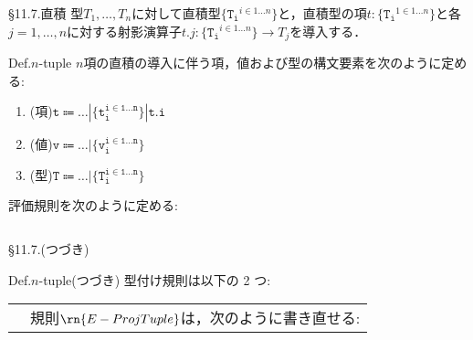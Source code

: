 \documentclass[9pt]{beamer}
\makeatletter
\newcommand{\dnote}[1]{%
    \noindent %
    \begin{tabular}{@{}m{0.13\textwidth}@{}m{0.87\textwidth}@{}}%
        \huge\textdbend &#1%
    \end{tabular}%
    \par %
}
\makeatother
\begin{document}
\begin{frame}{\S11.7.直積}
型$T_{1},\ldots,T_{n}$に対して直積型$\{\mathtt{T_{i}}^{i\in1\ldots n}\}$と，直積型の項$t:\{\mathtt{T_{i}}^{1\in1\ldots n}\}$と各$j = 1,\ldots, n$に対する射影演算子$t.j:\{\mathtt{T_{i}}^{i\in1\ldots n}\}\to T_{j}$を導入する．
\begin{alertblock}{Def.$n$-tuple}
$n$項の直積の導入に伴う項，値および型の構文要素を次のように定める:\begin{enumerate}
\item (項)$\mathtt{t\Coloneq\ldots|\{t_{i}^{i\in 1\ldots n}\}|t.i}$
\item (値)$\mathtt{v\Coloneq\ldots|\{\mathtt{v_{i}^{i\in1\ldots n}}\}}$
\item (型)$\mathtt{T\Coloneq\ldots|\{\mathtt{T_{i}^{i\in1\ldots n}}\}}$
\end{enumerate}
評価規則を次のように定める:
\begin{columns}
\begin{column}{0.5\columnwidth}
\end{column}
\begin{column}{0.5\columnwidth}
\end{column}
\end{columns}
\end{alertblock}
\end{frame}
\begin{frame}{\S11.7.(つづき)}
\begin{alertblock}{Def.$n$-tuple(つづき)}
型付け規則は以下の 2 つ:
\end{alertblock}
\dnote{規則$\rn{E-ProjTuple}$は，次のように書き直せる:
\infrule[E-ProjTuple]{1\leq j\leq n}{\mathtt{\{v_{i}^{i\in 1\ldots j - 1}, v_{j},v_{k}^{k\in j + 1\ldots n}\}.j\longrightarrow v_{j}}}}
\end{frame}
\end{document}
